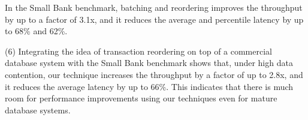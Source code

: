  In the Small Bank benchmark, batching and reordering improves the throughput by up to a factor of 3.1x, and it reduces the average and percentile latency by up to 68\% and 62\%.


(6) Integrating the idea of transaction reordering on top of a commercial database system with the Small Bank benchmark shows that, under high data contention, our technique increases the throughput by a factor of up to 2.8x, and it reduces the average latency by up to 66\%. This indicates that there is much room for performance improvements using our techniques even for mature database systems.
